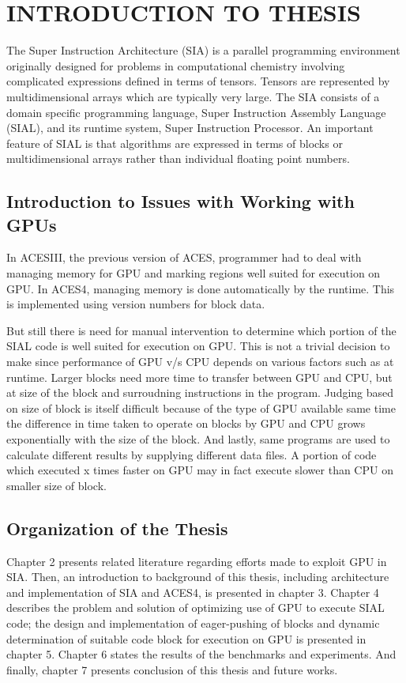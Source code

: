 \chapter{INTRODUCTION TO THESIS} \label{intro}

The Super Instruction Architecture (SIA) is a parallel programming environment
originally designed for problems in computational chemistry involving complicated
expressions defined in terms of tensors. Tensors are represented by
multidimensional arrays which are typically very large. The SIA consists of a
domain specific programming language, Super Instruction Assembly Language
(SIAL), and its runtime system, Super Instruction Processor. An important
feature of SIAL is that algorithms are expressed in terms of blocks or
multidimensional arrays rather than individual floating point numbers.

\section{Introduction to Issues with Working with GPUs}

In ACESIII, the previous version of ACES, programmer had to deal with managing
memory for GPU and marking regions well suited for execution on GPU. In ACES4,
managing memory is done automatically by the runtime. This is implemented using
version numbers for block data.

But still there is need for manual intervention to determine which
portion of the SIAL code is well suited for execution on GPU. This is not a
trivial decision to make since performance of GPU v/s CPU depends on various factors such as
at runtime. Larger blocks need more time to transfer between GPU and CPU, but at
size of the block and surroudning instructions in the program. Judging
based on size of block is itself difficult because of the type of GPU available
same time the difference in time taken to operate on blocks by GPU and CPU grows
exponentially with the size of the block. And lastly, same programs are used to
calculate different results by supplying different data files. A portion of code
which executed x times faster on GPU may in fact execute slower than CPU on
smaller size of block.

\section{Organization of the Thesis}
Chapter 2 presents related literature regarding efforts made to exploit GPU in
SIA. Then, an introduction to background of this thesis, including architecture
and implementation of SIA and ACES4, is presented in chapter 3. Chapter 4
describes the problem and solution of optimizing use of GPU to execute SIAL
code; the design and implementation of eager-pushing of blocks and dynamic
determination of suitable code block for execution on GPU is presented in
chapter 5. Chapter 6 states the results of the benchmarks and experiments. And
finally, chapter 7 presents conclusion of this thesis and future works.